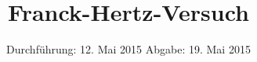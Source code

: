
\subject{Anfängerpraktikum V601}
\title{Franck-Hertz-Versuch}
\date{
  Durchführung: 12. Mai 2015
  \hspace{1em}
  Abgabe: 19. Mai 2015
}


\maketitle
\thispagestyle{empty}
\newpage





\printbibliography

